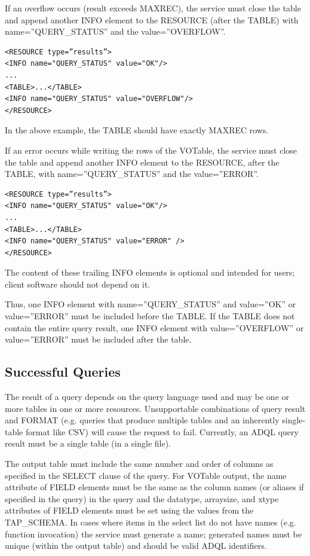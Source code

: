 \documentclass[11pt,letter]{ivoa}
\begin{document}
If an overflow occurs (result exceeds MAXREC), the service must close the table 
and append another INFO element to the RESOURCE (after the TABLE) with 
name=”QUERY\_STATUS” and the value=”OVERFLOW”.
\begin{verbatim}
<RESOURCE type=”results”>
<INFO name="QUERY_STATUS" value="OK"/>
...
<TABLE>...</TABLE>
<INFO name="QUERY_STATUS" value="OVERFLOW"/>
</RESOURCE>
\end{verbatim}

In the above example, the TABLE should have exactly MAXREC rows.

If an error occurs while writing the rows of the VOTable, the service must 
close the table and append another INFO element to the RESOURCE, after the 
TABLE, with name=”QUERY\_STATUS” and the value=”ERROR”.
\begin{verbatim}
<RESOURCE type=”results”>
<INFO name="QUERY_STATUS" value="OK"/>
...
<TABLE>...</TABLE>
<INFO name="QUERY_STATUS" value="ERROR" />
</RESOURCE>
\end{verbatim}
The content of these trailing INFO elements is optional and intended for users; 
client software should not depend on it.

Thus, one INFO element with name=”QUERY\_STATUS” and value=”OK” or 
value=”ERROR” must be included before the TABLE. If the TABLE does not contain 
the entire query result, one INFO element with value=”OVERFLOW” or 
value=”ERROR” must be included after the table. 

\subsection{Successful Queries}
\label{sec:query-ok}

The result of a query depends on the query language used and may be one or more 
tables in one or more resources. Unsupportable combinations of query result and 
FORMAT (e.g. queries that produce multiple tables and an inherently 
single-table format like CSV) will cause the request to fail. Currently, an ADQL 
query result must be a single table (in a single file).

The output table must include the same number and order of columns as specified 
in the SELECT clause of the query. For VOTable output, the name attribute of 
FIELD elements must be the same as the column names (or aliases if specified in 
the query) in the query and the datatype, arraysize, and xtype 
attributes of FIELD elements must be set using the values from the TAP\_SCHEMA. 
In cases where items in the select list do not 
have names (e.g. function invocation) the service must generate a name; 
generated names must be unique (within the output table) and should be valid 
ADQL identifiers.
\end{document}
